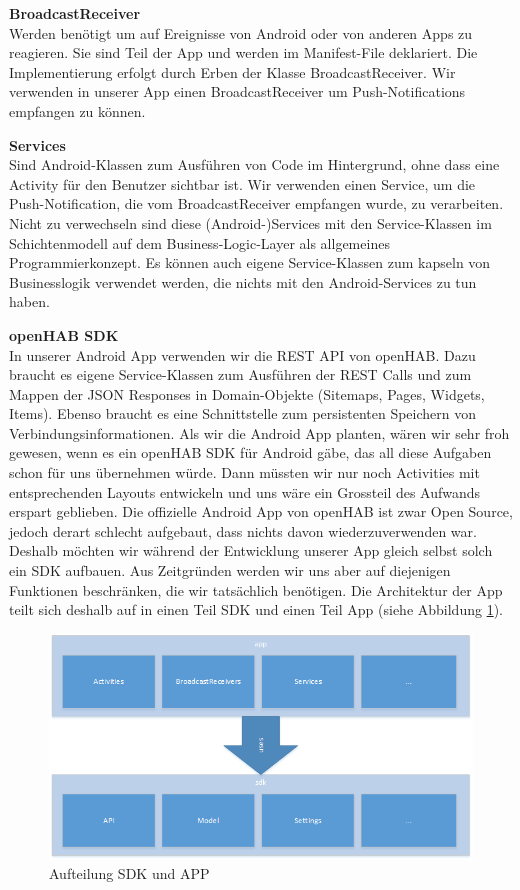 \textbf{BroadcastReceiver}\\
Werden benötigt um auf Ereignisse von Android oder von anderen Apps zu reagieren. Sie sind Teil der App und werden im Manifest-File deklariert. Die Implementierung erfolgt durch Erben der Klasse BroadcastReceiver. Wir verwenden in unserer App einen BroadcastReceiver um Push-Notifications empfangen zu können.

\textbf{Services}\\
Sind Android-Klassen zum Ausführen von Code im Hintergrund, ohne dass eine Activity für den Benutzer sichtbar ist. Wir verwenden einen Service, um die Push-Notification, die vom BroadcastReceiver empfangen wurde, zu verarbeiten. Nicht zu verwechseln sind diese (Android-)Services mit den Service-Klassen im Schichtenmodell auf dem Business-Logic-Layer als allgemeines Programmierkonzept. Es können auch eigene Service-Klassen zum kapseln von Businesslogik verwendet werden, die nichts mit den Android-Services zu tun haben.

\textbf{openHAB SDK}\\
In unserer Android App verwenden wir die REST API von openHAB. Dazu braucht es eigene Service-Klassen zum Ausführen der REST Calls und zum Mappen der JSON Responses in Domain-Objekte (Sitemaps, Pages, Widgets, Items). Ebenso braucht es eine Schnittstelle zum persistenten Speichern von Verbindungsinformationen. Als wir die Android App planten, wären wir sehr froh gewesen, wenn es ein openHAB SDK für Android gäbe, das all diese Aufgaben schon für uns übernehmen würde. Dann müssten wir nur noch Activities mit entsprechenden Layouts entwickeln und uns wäre ein Grossteil des Aufwands erspart geblieben. Die offizielle Android App von openHAB ist zwar Open Source, jedoch derart schlecht aufgebaut, dass nichts davon wiederzuverwenden war. Deshalb möchten wir während der Entwicklung unserer App gleich selbst solch ein SDK aufbauen. Aus Zeitgründen werden wir uns aber auf diejenigen Funktionen beschränken, die wir tatsächlich benötigen. Die Architektur der App teilt sich deshalb auf in einen Teil SDK und einen Teil App (siehe Abbildung \ref{fig:androidArchSdk}). 

\begin{figure}[H]
	\centering
		\includegraphics[width=\textwidth]{report/img/android_arch_sdk.png}
	\caption{Aufteilung SDK und APP}
	\label{fig:androidArchSdk}
\end{figure}


